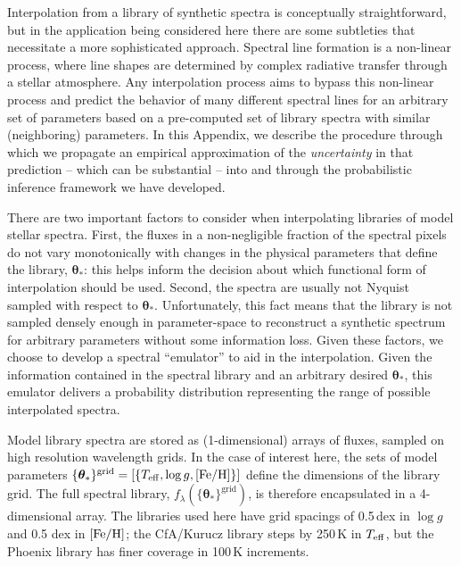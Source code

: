 \documentclass[iop,floatfix,numberedappendix,twocolappendix]{emulateapj}
\newcommand{\Z}{[{\rm Fe}/{\rm H}]}
\newcommand{\vt}{ {\bm \theta}}
\begin{document}
Interpolation from a library of synthetic spectra is conceptually straightforward, but in the 
application being considered here there are some subtleties that necessitate a more sophisticated 
approach.  Spectral line formation is a non-linear process, where line shapes are determined by 
complex radiative transfer through a stellar atmosphere.  Any interpolation process aims to bypass 
this non-linear process and predict the behavior of many different spectral lines for an arbitrary 
set of parameters based on a pre-computed set of library spectra with similar (neighboring) 
parameters.  In this Appendix, we describe the procedure through which we propagate an empirical 
approximation of the {\it uncertainty} in that prediction -- which can be substantial -- into and 
through the probabilistic inference framework we have developed.

There are two important factors to consider when interpolating libraries of model stellar spectra.  
First, the fluxes in a non-negligible fraction of the spectral pixels do not vary monotonically 
with changes in the physical parameters that define the library, $\vt_{\ast}$: this helps inform 
the decision about which functional form of interpolation should be used.  Second, the spectra 
are usually not Nyquist sampled with respect to $\vt_{\ast}$.  Unfortunately, this fact means that 
the library is not sampled densely enough in parameter-space to reconstruct a synthetic spectrum 
for arbitrary parameters without some information loss.  Given these factors, we choose to develop 
a spectral ``emulator'' to aid in the interpolation.  Given the information contained in 
the spectral library and an arbitrary desired $\vt_{\ast}$, this emulator delivers a probability 
distribution representing the range of possible interpolated spectra. 

Model library spectra are stored as (1-dimensional) arrays of fluxes, sampled on high resolution 
wavelength grids.  In the case of interest here, the sets of model parameters 
$\{\vt_{\ast}\}^\textrm{grid} = [\{T_{\rm eff}, \log g,  \Z \}]$ define the dimensions of the 
library grid.  The full spectral library, $f_{\lambda}(\{\vt_{\ast}\}^\textrm{grid})$, is therefore 
encapsulated in a 4-dimensional array.  The libraries used here have grid spacings of 0.5\,dex in 
$\log g$ and 0.5 dex in $\Z$; the {\sc CfA/Kurucz} library steps by 250\,K in $T_{\rm eff}$, but 
the {\sc Phoenix} library has finer coverage in 100\,K increments.  
\end{document}
